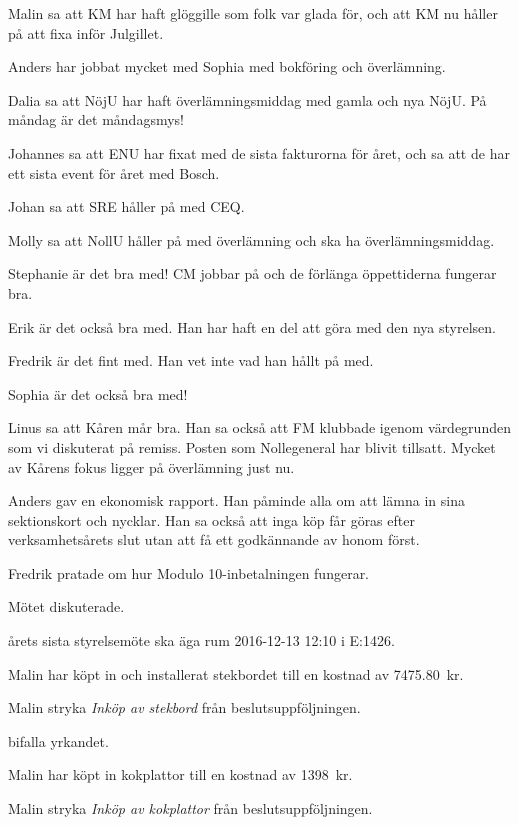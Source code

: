 \documentclass[10pt]{article}
\begin{document}
\begin{paragrafer}
\begin{paragrafer}
Malin sa att KM har haft glöggille som folk var glada för, och att KM nu håller på att fixa inför Julgillet.

Anders har jobbat mycket med Sophia med bokföring och överlämning.

Dalia sa att NöjU har haft överlämningsmiddag med gamla och nya NöjU. På måndag är det måndagsmys!

Johannes sa att ENU har fixat med de sista fakturorna för året, och sa att de har ett sista event för året med Bosch.

Johan sa att SRE håller på med CEQ.

Molly sa att NollU håller på med överlämning och ska ha överlämningsmiddag.

Stephanie är det bra med! CM jobbar på och de förlänga öppettiderna fungerar bra.

Erik är det också bra med. Han har haft en del att göra med den nya styrelsen.

Fredrik är det fint med. Han vet inte vad han hållt på med.

Sophia är det också bra med!

Linus sa att Kåren mår bra. Han sa också att FM klubbade igenom värdegrunden som vi diskuterat på remiss. Posten som Nollegeneral har blivit tillsatt. Mycket av Kårens fokus ligger på överlämning just nu.

Anders gav en ekonomisk rapport. Han påminde alla om att lämna in sina sektionskort och nycklar. Han sa också att inga köp får göras efter verksamhetsårets slut utan att få ett godkännande av honom först.

\end{paragrafer}

Fredrik pratade om hur Modulo 10-inbetalningen fungerar.

Mötet diskuterade.

{\Mba} årets sista styrelsemöte ska äga rum 2016-12-13 12:10 i E:1426.

Malin har köpt in och installerat stekbordet till en kostnad av \SI{7475.80}{kr}.

Malin \ypa stryka \emph{Inköp av stekbord} från beslutsuppföljningen.

\Mba bifalla yrkandet.

Malin har köpt in kokplattor till en kostnad av \SI{1398}{kr}.

Malin \ypa stryka \emph{Inköp av kokplattor} från beslutsuppföljningen.


\end{paragrafer}
\end{document}
